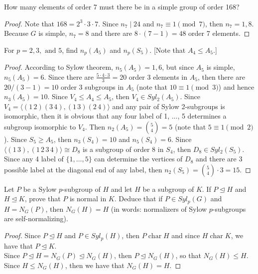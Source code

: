 \documentclass{article}
\newenvironment{problem}[2][Problem]{\begin{trivlist}
\item[\hskip \labelsep {\bfseries #1}\hskip \labelsep {\bfseries #2.}]}{\end{trivlist}}
\DeclareMathOperator{\Char}{char}
\begin{document}
\begin{problem}{30}
        How many elements of order 7 must there be in a simple group of order 168?
\end{problem}
\begin{proof}
    Note that $168 = 2^3 \cdot 3 \cdot 7$. Since $n_7 \mid 24$ and $n_7 \equiv 1 \pmod 7$, then $n_7=1, 8$. Because $G$ is simple, $n_7=8$ and there are $8 \cdot (7-1)=48$ order 7 elements.
\end{proof}
\begin{problem}{31}
        For $p = 2, 3, \text{ and } 5$, find $n_p(A_5)$ and $n_p(S_5)$. [Note that $A_4 \leq A_5$.]
\end{problem}
\begin{proof}
    According to Sylow theorem, $n_5(A_5)=1, 6$, but since $A_5$ is simple, $n_5(A_5)=6$. Since there are $\frac{5 \cdot 4 \cdot 3}{3}=20$ order $3$ elements in $A_5$, then there are $20/(3-1) = 10$ order 3 subgroups in $A_5$ (note that $10\equiv1 \pmod 3$) and hence $n_3(A_5)=10$. Since $V_4 \leq A_4 \leq A_5$, then $V_4\in Syl_2(A_5)$. Since $V_4=\langle (1\, 2)(3\, 4), (1\, 3)(2\, 4)\rangle$ and any pair of Sylow 2-subgroups is isomorphic, then it is obvious that any four label of 1, ..., 5 determines a subgroup isomorphic to $V_4$. Then $n_2(A_5)=\binom{5}{4}=5$ (note that $5 \equiv 1 \pmod 2$). Since $S_5\geq A_5$, then $n_3(S_4) = 10$ and $n_5(S_4)=6$. Since $\langle (1\, 3), (1\, 2\, 3\, 4) \rangle\cong D_8$ is a subgroup of order $8$ in $S_4$, then $D_8\in Syl_2(S_5)$. Since any 4 label of $\{1, \dots , 5\}$ can determine the vertices of $D_8$ and there are 3 possible label at the diagonal end of any label, then $n_2(S_5)=\binom{5}{4}\cdot 3=15$. 
\end{proof}
\begin{problem}{32}
    Let $P$ be a Sylow $p$-subgroup of $H$ and let $H$ be a subgroup of $K$. If $P \trianglelefteq H$ and $H \trianglelefteq K$, prove that $P$ is normal in $K$. Deduce that if $P \in Syl_p(G)$ and $H = N_G(P)$, then $N_G(H) = H$ (in words: normalizers of Sylow $p$-subgroups are self-normalizing).
\end{problem}
\begin{proof}
    Since $P\trianglelefteq H$ and $P\in Syl_p(H)$, then $P\Char H$ and since $H\Char K$, we have that $P\trianglelefteq K$.\\
    Since $P\trianglelefteq H=N_G(P) \trianglelefteq N_G(H)$, then $P\trianglelefteq N_G(H)$, so that $N_G(H)\leq H$. Since $H\leq N_G(H)$, then we have that $N_G(H)=H$.
\end{proof}
\end{document}
